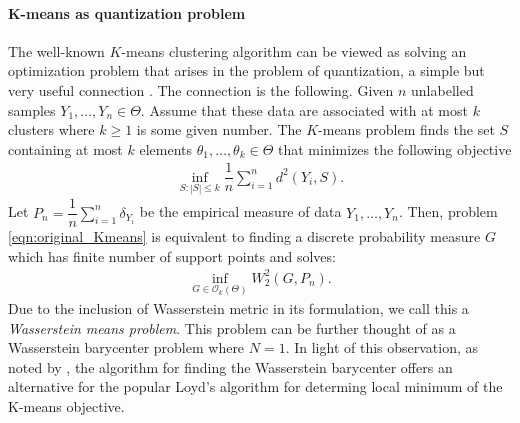 \paragraph{K-means as quantization problem}
The well-known $K$-means clustering algorithm can be viewed as solving
an optimization problem that arises in the problem of quantization, a simple but very useful connection 
\citep{Pollard-1982, Graf-2000}. The connection is the following.
Given $n$ unlabelled samples $Y_{1},\ldots,Y_{n} \in \Theta$. Assume that these data are associated
with at most $k$ clusters where $k \geq 1$ is some given number. The $K$-means problem finds the set $S$ 
containing at most $k$ elements $\theta_{1},\ldots, \theta_{k} \in \Theta$ that minimizes 
the following objective
\vspace{-6pt}
\begin{eqnarray}
\mathop {\inf }\limits_{S : |S| \leq k}{\dfrac{1}{n}\sum \limits_{i=1}^{n}{d^{2}(Y_{i},S)}}. \label{eqn:original_Kmeans}
\end{eqnarray}
Let $P_{n}=\dfrac{1}{n}\sum \limits_{i=1}^{n}{\delta_{Y_{i}}}$ be the empirical measure of data 
$Y_{1},\ldots,Y_{n}$. Then, problem \eqref{eqn:original_Kmeans} is 
equivalent to finding a discrete probability measure $G$ which has finite 
number of support points and solves:
\vspace{-6pt}
\begin{eqnarray}
\mathop {\inf }\limits_{G \in \mathcal{O}_{k}(\Theta)}{W_{2}^{2}(G,P_{n})}. \label{eqn:Wasserstein_K_means}
\end{eqnarray} 
Due to the inclusion of Wasserstein metric in its formulation, we call this
a \emph{Wasserstein means problem}. This problem can be further thought of as a 
Wasserstein barycenter problem where $N=1$. In light of this observation, as noted by
\citep{Cuturi-2014}, the algorithm for finding the Wasserstein barycenter offers an 
alternative for the popular Loyd's algorithm for determing local minimum of the K-means objective. 
